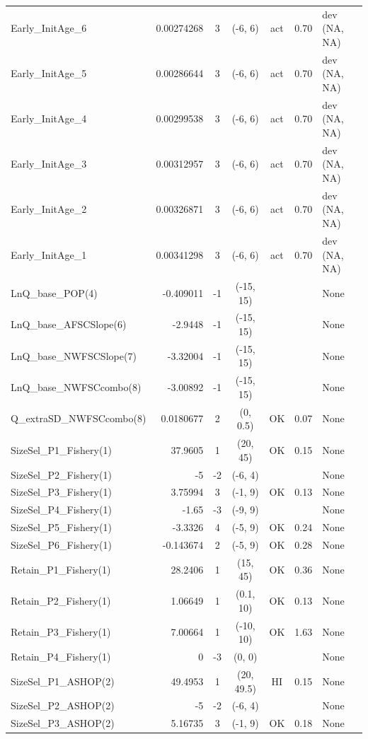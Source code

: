 \documentclass[12pt,]{article}
\begin{document}
\begin{landscape}
\begin{longtable}{lrcccll}
  Early\_InitAge\_6 & 0.00274268 & 3 & (-6, 6) & act & 0.70 & dev (NA, NA) \\ 
  Early\_InitAge\_5 & 0.00286644 & 3 & (-6, 6) & act & 0.70 & dev (NA, NA) \\ 
  Early\_InitAge\_4 & 0.00299538 & 3 & (-6, 6) & act & 0.70 & dev (NA, NA) \\ 
  Early\_InitAge\_3 & 0.00312957 & 3 & (-6, 6) & act & 0.70 & dev (NA, NA) \\ 
  Early\_InitAge\_2 & 0.00326871 & 3 & (-6, 6) & act & 0.70 & dev (NA, NA) \\ 
  Early\_InitAge\_1 & 0.00341298 & 3 & (-6, 6) & act & 0.70 & dev (NA, NA) \\ 
  LnQ\_base\_POP(4) & -0.409011 & -1 & (-15, 15) &  &  & None \\ 
  LnQ\_base\_AFSCSlope(6) & -2.9448 & -1 & (-15, 15) &  &  & None \\ 
  LnQ\_base\_NWFSCSlope(7) & -3.32004 & -1 & (-15, 15) &  &  & None \\ 
  LnQ\_base\_NWFSCcombo(8) & -3.00892 & -1 & (-15, 15) &  &  & None \\ 
  Q\_extraSD\_NWFSCcombo(8) & 0.0180677 & 2 & (0, 0.5) & OK & 0.07 & None \\ 
  SizeSel\_P1\_Fishery(1) & 37.9605 & 1 & (20, 45) & OK & 0.15 & None \\ 
  SizeSel\_P2\_Fishery(1) & -5 & -2 & (-6, 4) &  &  & None \\ 
  SizeSel\_P3\_Fishery(1) & 3.75994 & 3 & (-1, 9) & OK & 0.13 & None \\ 
  SizeSel\_P4\_Fishery(1) & -1.65 & -3 & (-9, 9) &  &  & None \\ 
  SizeSel\_P5\_Fishery(1) & -3.3326 & 4 & (-5, 9) & OK & 0.24 & None \\ 
  SizeSel\_P6\_Fishery(1) & -0.143674 & 2 & (-5, 9) & OK & 0.28 & None \\ 
  Retain\_P1\_Fishery(1) & 28.2406 & 1 & (15, 45) & OK & 0.36 & None \\ 
  Retain\_P2\_Fishery(1) & 1.06649 & 1 & (0.1, 10) & OK & 0.13 & None \\ 
  Retain\_P3\_Fishery(1) & 7.00664 & 1 & (-10, 10) & OK & 1.63 & None \\ 
  Retain\_P4\_Fishery(1) & 0 & -3 & (0, 0) &  &  & None \\ 
  SizeSel\_P1\_ASHOP(2) & 49.4953 & 1 & (20, 49.5) & HI & 0.15 & None \\ 
  SizeSel\_P2\_ASHOP(2) & -5 & -2 & (-6, 4) &  &  & None \\ 
  SizeSel\_P3\_ASHOP(2) & 5.16735 & 3 & (-1, 9) & OK & 0.18 & None \\ 

\end{longtable}
\end{landscape}
\end{document}
